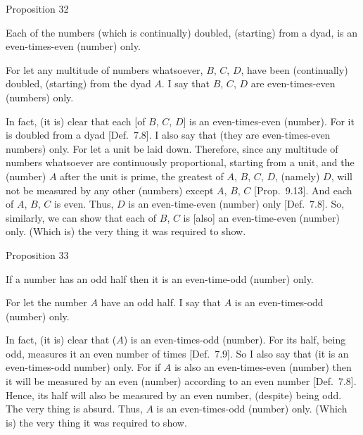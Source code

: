 
\begin{center}
{\large Proposition 32}
\end{center}

Each of the numbers (which is continually) doubled,
(starting) from a dyad, is an even-times-even (number) only.

\epsfysize=1.1in
\centerline{}

For let any multitude of numbers whatsoever, $B$, $C$, $D$, have been
(continually) doubled, (starting) from the dyad $A$. I say that
$B$, $C$, $D$ are  even-times-even (numbers) only.

In fact, (it is) clear that each [of $B$, $C$, $D$] is an even-times-even (number). For it is doubled from a dyad [Def.~7.8]. 
I also say that (they are even-times-even numbers) only. For let a unit
be laid down. Therefore, since any multitude of numbers whatsoever
are continuously proportional, starting from a unit, and the (number) $A$ after the unit is prime, the greatest of $A$, $B$, $C$, $D$, (namely) $D$,
will not be measured by any other (numbers) except $A$, $B$, $C$
[Prop.~9.13].
And each of $A$, $B$, $C$ is even. Thus, $D$ is an
even-time-even (number) only [Def.~7.8]. So, similarly,
we can show that each of $B$, $C$ is [also]  an even-time-even (number) only. (Which is) the very thing it was required to show.


\begin{center}
{\large Proposition 33}
\end{center}

If a number has an odd half then it is an
even-time-odd (number) only.

\epsfysize=0.175in
\centerline{}

For let the number $A$ have an odd half. I say that $A$ is  an
even-times-odd (number) only.

In fact, (it is) clear that ($A$) is an even-times-odd (number). For its
half, being odd, measures it an even number of times [Def.~7.9]. So I also say that (it is an even-times-odd number) only. For if $A$ is also  an even-times-even
(number) then it will be measured by an even (number) according to
an even number [Def.~7.8]. Hence, its half
will also be measured by an even number, (despite)  being odd. The very
thing is absurd. Thus, $A$ is  an even-times-odd (number) only. (Which is)
the very thing it was required to show.

